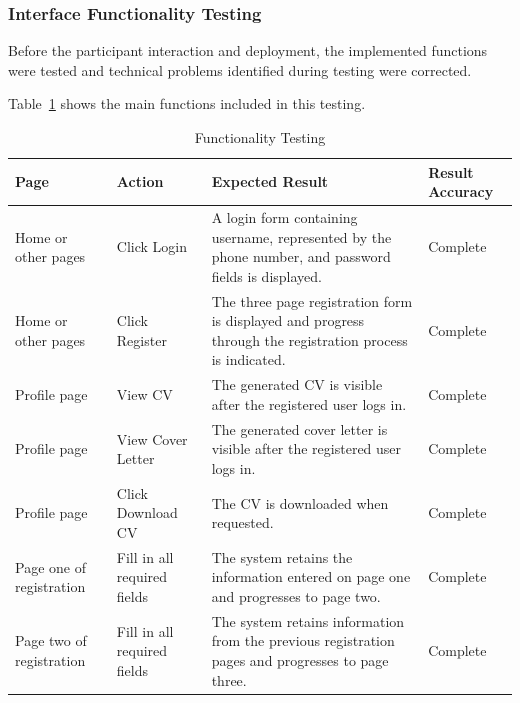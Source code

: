 \FloatBarrier


\subsubsection{Interface Functionality Testing}

Before the participant interaction and deployment, the implemented functions were tested and technical problems identified during testing were corrected.

Table~\ref{tab:functionality_testing} shows the main functions included in this testing.

\begin{table}[H]
\centering
\caption{Functionality Testing}
\label{tab:functionality_testing}
\renewcommand{\arraystretch}{1.2}
\begin{tabularx}{\textwidth}{
|p{3.2cm}|
p{3cm}|
X|
>{\centering\arraybackslash}p{2cm}|
}
\hline
\rowcolor{gray!30}
Page & Action & Expected Result & Result Accuracy \\
\hline

Home or other pages &
Click Login &
A login form containing username, represented by the phone number, and password fields is displayed. &
Complete \\
\hline

Home or other pages &
Click Register &
The three page registration form is displayed and progress through the registration process is indicated. &
Complete \\
\hline

Profile page &
View CV &
The generated CV is visible after the registered user logs in. &
Complete \\
\hline

Profile page &
View Cover Letter &
The generated cover letter is visible after the registered user logs in. &
Complete \\
\hline

Profile page &
Click Download CV &
The CV is downloaded when requested. &
Complete \\
\hline

Page one of registration &
Fill in all required fields &
The system retains the information entered on page one and progresses to page two. &
Complete \\
\hline

Page two of registration &
Fill in all required fields &
The system retains information from the previous registration pages and progresses to page three. &
Complete \\
\hline


\end{tabularx}
\end{table}
